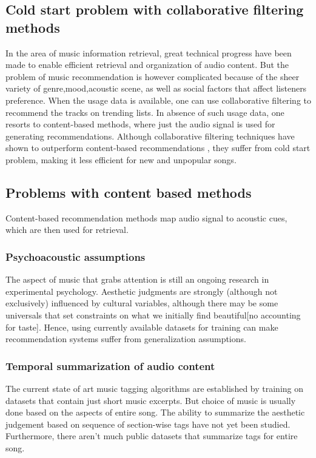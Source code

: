 \subsection{Cold start problem with collaborative filtering methods}
In the area of music information retrieval, great technical progress have been made to enable efficient retrieval and organization of audio content. But the problem of music recommendation is  however complicated because of the sheer variety of genre,mood,acoustic scene, as well as social factors that affect listeners preference. When the usage data is available, one can use collaborative filtering to recommend the tracks on trending lists. In absence of such usage data, one resorts to content-based methods, where just the audio signal is used for generating recommendations.  Although collaborative filtering techniques have shown to outperform content-based recommendations \cite{DC1}, they suffer from cold start problem, making it less efficient for new and unpopular songs. 


\subsection{Problems with content based methods}
\label{problems}
Content-based recommendation methods map audio signal to acoustic cues, which are then used for retrieval.

\subsubsection{Psychoacoustic assumptions}
The aspect of music that grabs attention is still an ongoing research in experimental psychology. Aesthetic judgments are strongly (although not exclusively) influenced by cultural variables, although there may be some universals that set constraints on what we initially find beautiful[no accounting for taste]. Hence, using currently available datasets\cite{MSD}\cite{MTT} for training can make recommendation systems suffer from generalization assumptions.  

\subsubsection{Temporal summarization of audio content}
The current state of art music tagging algorithms\cite{choi_crnn}\cite{MultiScale} are established by training on datasets that contain just short music excerpts. But choice of music is usually done based on the aspects of entire song. The ability to summarize the aesthetic judgement based on sequence of section-wise tags have not yet been studied. Furthermore, there aren’t much public datasets that summarize tags for entire song. 



